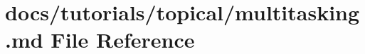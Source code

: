 \hypertarget{multitasking_8md}{}\section{docs/tutorials/topical/multitasking.md File Reference}
\label{multitasking_8md}
